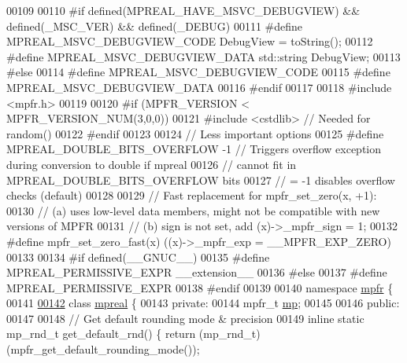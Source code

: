 \begin{DoxyCode}
00109 
00110 \textcolor{preprocessor}{#if defined(MPREAL\_HAVE\_MSVC\_DEBUGVIEW) && defined(\_MSC\_VER) && defined(\_DEBUG)}
00111 \textcolor{preprocessor}{    #define MPREAL\_MSVC\_DEBUGVIEW\_CODE     DebugView = toString();}
00112 \textcolor{preprocessor}{    #define MPREAL\_MSVC\_DEBUGVIEW\_DATA     std::string DebugView;}
00113 \textcolor{preprocessor}{#else}
00114 \textcolor{preprocessor}{    #define MPREAL\_MSVC\_DEBUGVIEW\_CODE}
00115 \textcolor{preprocessor}{    #define MPREAL\_MSVC\_DEBUGVIEW\_DATA}
00116 \textcolor{preprocessor}{#endif}
00117 
00118 \textcolor{preprocessor}{#include <mpfr.h>}
00119 
00120 \textcolor{preprocessor}{#if (MPFR\_VERSION < MPFR\_VERSION\_NUM(3,0,0))}
00121 \textcolor{preprocessor}{    #include <cstdlib>}                          \textcolor{comment}{// Needed for random()}
00122 \textcolor{preprocessor}{#endif}
00123 
00124 \textcolor{comment}{// Less important options}
00125 \textcolor{preprocessor}{#define MPREAL\_DOUBLE\_BITS\_OVERFLOW -1          // Triggers overflow exception during conversion to double
       if mpreal}
00126                                                 \textcolor{comment}{// cannot fit in MPREAL\_DOUBLE\_BITS\_OVERFLOW bits}
00127                                                 \textcolor{comment}{// = -1 disables overflow checks (default)}
00128 
00129 \textcolor{comment}{// Fast replacement for mpfr\_set\_zero(x, +1):}
00130 \textcolor{comment}{// (a) uses low-level data members, might not be compatible with new versions of MPFR}
00131 \textcolor{comment}{// (b) sign is not set, add (x)->\_mpfr\_sign = 1;}
00132 \textcolor{preprocessor}{#define mpfr\_set\_zero\_fast(x)  ((x)->\_mpfr\_exp = \_\_MPFR\_EXP\_ZERO)}
00133 
00134 \textcolor{preprocessor}{#if defined(\_\_GNUC\_\_)}
00135 \textcolor{preprocessor}{  #define MPREAL\_PERMISSIVE\_EXPR \_\_extension\_\_}
00136 \textcolor{preprocessor}{#else}
00137 \textcolor{preprocessor}{  #define MPREAL\_PERMISSIVE\_EXPR}
00138 \textcolor{preprocessor}{#endif}
00139 
00140 \textcolor{keyword}{namespace }\hyperlink{namespacempfr}{mpfr} \{
00141 
\hyperlink{classmpfr_1_1mpreal}{00142} \textcolor{keyword}{class }\hyperlink{classmpfr_1_1mpreal}{mpreal} \{
00143 \textcolor{keyword}{private}:
00144     mpfr\_t \hyperlink{namespaceboost_1_1multiprecision}{mp};
00145 
00146 \textcolor{keyword}{public}:
00147 
00148     \textcolor{comment}{// Get default rounding mode & precision}
00149     \textcolor{keyword}{inline} \textcolor{keyword}{static} mp\_rnd\_t   get\_default\_rnd()    \{    \textcolor{keywordflow}{return} (mp\_rnd\_t)(mpfr\_get\_default\_rounding\_mode());

\end{DoxyCode}
